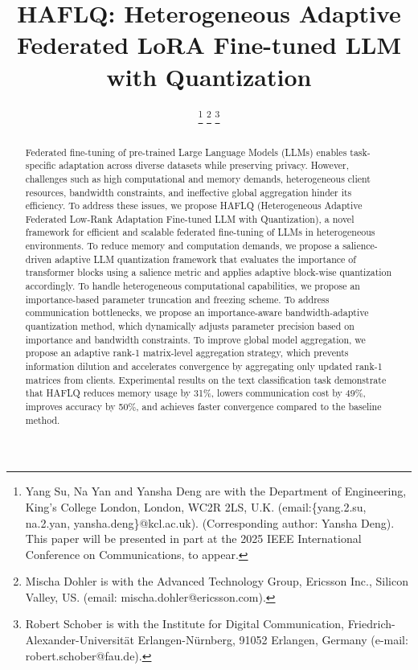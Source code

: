 \documentclass[journal]{IEEEtran}
\begin{document}
\title{HAFLQ: Heterogeneous Adaptive Federated LoRA Fine-tuned LLM with Quantization}

\author{
	\thanks{Yang Su, Na Yan and Yansha Deng are with the Department of Engineering, King’s College London, London, WC2R 2LS, U.K. (email:\{yang.2.su, na.2.yan, yansha.deng\}@kcl.ac.uk). (Corresponding author: Yansha Deng). This paper will be presented in part at the 2025 IEEE International Conference on Communications, to appear\cite{su2024federated}.}
 \thanks{Mischa Dohler is with the Advanced Technology Group, Ericsson Inc., Silicon Valley, US. (email: mischa.dohler@ericsson.com).}
\thanks{Robert Schober is with the Institute for Digital Communication,
Friedrich-Alexander-Universit\"at Erlangen-N\"urnberg, 91052 Erlangen, Germany (e-mail: robert.schober@fau.de).}
}
\maketitle

\begin{abstract}
Federated fine-tuning of pre-trained Large Language Models (LLMs) enables task-specific adaptation across diverse datasets while preserving privacy. However, challenges such as high computational and memory demands, heterogeneous client resources, bandwidth constraints, and ineffective global aggregation hinder its efficiency. To address these issues, we propose HAFLQ (Heterogeneous Adaptive Federated Low-Rank Adaptation Fine-tuned LLM with Quantization), a novel framework for efficient and scalable federated fine-tuning of LLMs in heterogeneous environments.
To reduce memory and computation demands, we propose a salience-driven adaptive LLM quantization framework that evaluates the importance of transformer blocks using a salience metric and applies adaptive block-wise quantization accordingly.
To handle heterogeneous computational capabilities, we propose an importance-based parameter truncation and freezing scheme. 
To address communication bottlenecks, we propose an importance-aware bandwidth-adaptive quantization method, which dynamically adjusts parameter precision based on importance and bandwidth constraints.
To improve global model aggregation, we propose an adaptive rank-1 matrix-level aggregation strategy, which prevents information dilution and accelerates convergence by aggregating only updated rank-1 matrices from clients.
Experimental results on the text classification task demonstrate that HAFLQ reduces memory usage by 31\%, lowers communication cost by 49\%, improves accuracy by 50\%, and achieves faster convergence compared to the baseline method.




\end{abstract}
\end{document}
